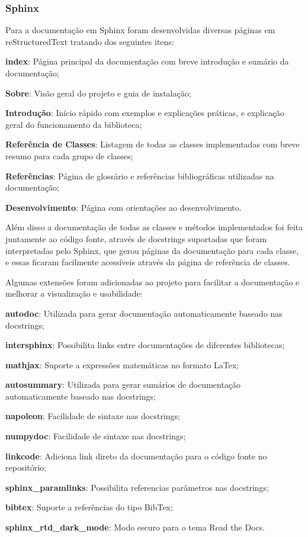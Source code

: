 \subsubsection{Sphinx}

Para a documentação em Sphinx foram desenvolvidas diversas páginas em reStructuredText tratando dos seguintes itens:
\begin{alineas}
    \item \textbf{index}: Página principal da documentação com breve introdução e sumário da documentação;
    \item \textbf{Sobre}: Visão geral do projeto e guia de instalação;
    \item \textbf{Introdução}: Início rápido com exemplos e explicações práticas, e explicação geral do funcionamento da biblioteca;
    \item \textbf{Referência de Classes}: Listagem de todas as classes implementadas com breve resumo para cada grupo de classes;
    \item \textbf{Referências}: Página de glossário e referências bibliográficas utilizadas na documentação;
    \item \textbf{Desenvolvimento}: Página com orientações ao desenvolvimento.
\end{alineas}

Além disso a documentação de todas as classes e métodos implementados foi feita juntamente ao código fonte, através de
docstrings suportadas que foram interpretadas pelo Sphinx, que gerou páginas da documentação para cada classe, e essas
ficaram facilmente acessíveis através da página de referência de classes.

Algumas extensões foram adicionadas ao projeto para facilitar a documentação e melhorar a visualização e usabilidade:

\begin{alineas}
    \item \textbf{autodoc}: Utilizada para gerar documentação automaticamente baseado nas docstrings;
    \item \textbf{intersphinx}: Possibilita links entre documentações de diferentes bibliotecas;
    \item \textbf{mathjax}: Suporte a expressões matemáticas no formato LaTex;
    \item \textbf{autosummary}: Utilizada para gerar sumários de documentação automaticamente baseado nas docstrings;
    \item \textbf{napoleon}: Facilidade de sintaxe nas docstrings;
    \item \textbf{numpydoc}: Facilidade de sintaxe nas docstrings;
    \item \textbf{linkcode}: Adiciona link direto da documentação para o código fonte no repositório;
    \item \textbf{sphinx\_paramlinks}: Possibilita referencias parâmetros nas docstrings;
    \item \textbf{bibtex}: Suporte a referências do tipo BibTex;
    \item \textbf{sphinx\_rtd\_dark\_mode}: Modo escuro para o tema Read the Docs.
\end{alineas}

